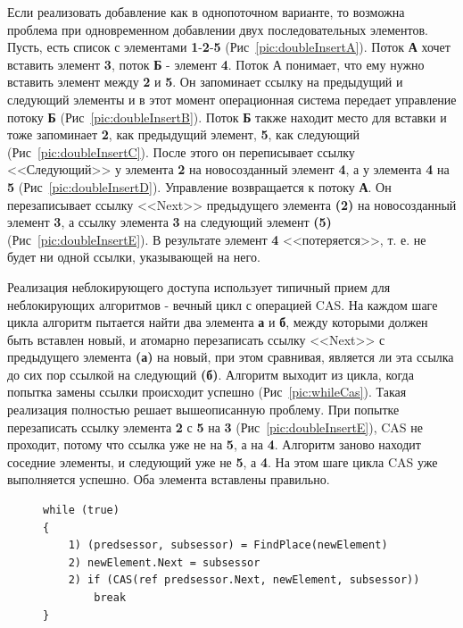 \documentclass[12pt]{article}
\begin{document}
{				\par Если реализовать добавление как в однопоточном варианте, то возможна проблема при одновременном добавлении двух последовательных элементов. Пусть, есть список с элементами \textbf{1}-\textbf{2}-\textbf{5} (Рис~\ref{pic:doubleInsertA}). Поток \textbf{А} хочет вставить элемент \textbf{3}, поток \textbf{Б} - элемент \textbf{4}. Поток А понимает, что ему нужно вставить элемент между \textbf{2} и \textbf{5}. Он запоминает ссылку на предыдущий и следующий элементы и в этот момент операционная система передает управление потоку \textbf{Б} (Рис~\ref{pic:doubleInsertB}). Поток \textbf{Б} также находит место для вставки и тоже запоминает \textbf{2}, как предыдущий элемент, \textbf{5}, как следующий (Рис~\ref{pic:doubleInsertC}). После этого он переписывает ссылку <<Следующий>> у элемента \textbf{2} на новосозданный элемент \textbf{4}, а у элемента \textbf{4} на \textbf{5} (Рис~\ref{pic:doubleInsertD}). Управление возвращается к потоку \textbf{А}. Он перезаписывает ссылку <<Next>> предыдущего элемента \textbf{(2)} на новосозданный элемент \textbf{3}, а ссылку элемента \textbf{3} на следующий элемент \textbf{(5)} (Рис~\ref{pic:doubleInsertE}). В результате элемент \textbf{4} <<потеряется>>, т. е. не будет ни одной ссылки, указывающей на него.
				\par Реализация неблокирующего доступа использует типичный прием для неблокирующих алгоритмов - вечный цикл с операцией CAS. На каждом шаге цикла алгоритм пытается найти два элемента \textbf{а} и \textbf{б}, между которыми должен быть вставлен новый, и атомарно перезаписать ссылку <<Next>> с предыдущего элемента \textbf{(а)} на новый, при этом сравнивая, является ли эта ссылка до сих пор ссылкой на следующий \textbf{(б)}. Алгоритм выходит из цикла, когда попытка замены ссылки происходит успешно (Рис~\ref{pic:whileCas}). Такая реализация полностью решает вышеописанную проблему. При попытке перезаписать ссылку элемента \textbf{2} с \textbf{5} на \textbf{3}  (Рис~\ref{pic:doubleInsertE}), CAS не проходит, потому что ссылка уже не на \textbf{5}, а на \textbf{4}. Алгоритм заново находит соседние элементы, и следующий уже не \textbf{5}, а \textbf{4}. На этом шаге цикла CAS уже выполняется успешно. Оба элемента вставлены правильно.
				\begin{figure}[h]
					\begin{lstlisting}
while (true)
{	
	1) (predsessor, subsessor) = FindPlace(newElement)
	2) newElement.Next = subsessor
	2) if (CAS(ref predsessor.Next, newElement, subsessor))
		break
}
					\end{lstlisting}

\end{figure}}
\end{document}
